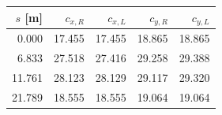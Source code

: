 \begin{tabular}{rrrrr}\toprule
$s$ [m] & $c_{x,R}$ & $c_{x,L}$ & $c_{y,R}$ & $c_{y,L}$ \\\midrule
0.000 & 17.455 & 17.455 & 18.865 & 18.865 \\
6.833 & 27.518 & 27.416 & 29.258 & 29.388 \\
11.761 & 28.123 & 28.129 & 29.117 & 29.320 \\
21.789 & 18.555 & 18.555 & 19.064 & 19.064 \\
\bottomrule\end{tabular}
